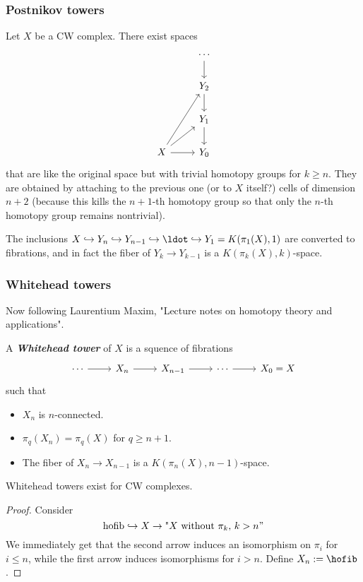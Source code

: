 \begin{remark}
\subsubsection{Postnikov towers}
Let $X$ be a CW complex. There exist spaces
\[\begin{tikzcd}
	&\cdots\arrow[d]\\
	&Y_{2}\arrow[d]\\
	&Y_{1}\arrow[d]\\
	X\arrow[uur]\arrow[ur]\arrow[r]&Y_{0}
\end{tikzcd}\]
that are like the original space but with trivial homotopy groups for $k\geq n$. They are obtained by attaching to the previous one {\color{blue}(or to $X$ itself?)} cells of dimension $n+2$ (because this kills the $n+1$-th homotopy group so that only the $n$-th homotopy group remains nontrivial).

The inclusions $X\hookrightarrow Y_{n}\hookrightarrow Y_{n-1}\hookrightarrow \ldot\hookrightarrow Y_{1}=K(\pi_{1}(X),1)$ are converted to fibrations, and in fact the fiber of $Y_{k}\to Y_{k-1}$ is a $K(\pi_{k}(X),k)$-space.

\subsubsection{Whitehead towers}

Now following Laurentium Maxim, "Lecture notes on homotopy theory and applications".

\begin{definition}
	A \textit{\textbf{Whitehead tower}} of $X$ is a squence of fibrations
	\[\begin{tikzcd}
		\cdots \arrow[r]&X_{n}\arrow[r]&X_{n-1}\arrow[r]&\cdots \arrow[r]&X_{0}=X
	\end{tikzcd}\]
	such that
	\begin{itemize}
		\item $X_n$ is $n$-connected.
		\item $\pi_{q}(X_{n})=\pi_{q}(X)$ for $q\geq n+1$.
		\item The fiber of $X_n\to  X_{n-1}$ is a $K(\pi_{n}(X),n-1)$-space.
	\end{itemize}
\end{definition}
\begin{lemma}
	Whitehead towers exist for CW complexes.
\end{lemma}
\begin{proof}
	Consider
	\[\text{hofib}\hookrightarrow X\to \text{"$X$ without $\pi_{k}$, $k>n$}"\]
	We immediately get that the second arrow induces an isomorphism on $\pi_{i}$ for $i\leq n$, while the first arrow induces isomorphisms for $i>n$. Define $ X_{n}:=\hofib$.


\end{proof}
\end{remark}
